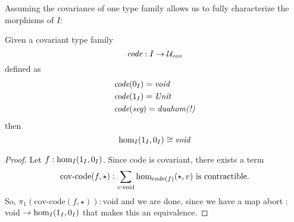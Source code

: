 \documentclass[main.tex]{subfiles}
\begin{document}
Assuming the covariance of one type family allows us to fully characterize the morphisms of $I$:
\begin{lemma}
    Given a covariant type family $$\emph{code} : I \to \mathcal{U_{\emph{cov}}}$$
    defined as
    \begin{align*}
        &\emph{code}(0_I) = \emph{void}\\
        &\emph{code}(1_I) = \emph{Unit}\\
        &\emph{code}(\emph{\seg}) = \emph{duahom(!)}
    \end{align*}
    then
    $$\ho[I]{1_I}{0_I} \cong \emph{void}$$
\end{lemma}
\begin{proof}
Let  $f : \ho[I]{1_I}{0_I}$. Since code is covariant, there exists a term 
$$\text{cov-code}(f, \star) : \sum_{v : \text{void}}\ho[\text{code}(f)]{\star}{v} \text{ is contractible}.$$
So, $\pi_1(\text{cov-code}(f,\star)):\text{void}$ and we are done, since we have a map abort : void $\to \ho[I]{1_I}{0_I}$ that makes this an equivalence.
\end{proof}
\end{document}
